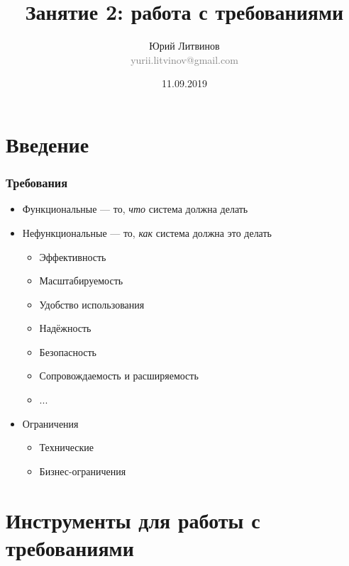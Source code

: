 \documentclass[xetex,mathserif,serif]{beamer}
\title{Занятие 2: работа с требованиями}
\author[Юрий Литвинов]{Юрий Литвинов\\\small{\textcolor{gray}{yurii.litvinov@gmail.com}}}
\date{11.09.2019}
\begin{document}
	\frame{\titlepage}

	\section{Введение}

	\begin{frame}
		\frametitle{Требования}
		\begin{itemize}
			\item Функциональные --- то, \emph{что} система должна делать
			\item Нефункциональные --- то, \emph{как} система должна это делать
			\begin{itemize}
				\item Эффективность
				\item Масштабируемость
				\item Удобство использования
				\item Надёжность
				\item Безопасность
				\item Сопровождаемость и расширяемость
				\item ...
			\end{itemize}
			\item Ограничения
			\begin{itemize}
				\item Технические
				\item Бизнес-ограничения
			\end{itemize}
		\end{itemize}
	\end{frame}

	\section{Инструменты для работы с требованиями}
\end{document}
